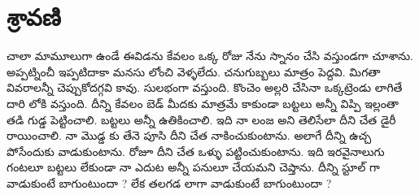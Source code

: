 \documentclass{article}
\begin{document}
\section*{శ్రావణి}
చాలా మామూలుగా ఉండే ఈవిడను కేవలం ఒక్క రోజు నేను స్నానం చేసి వస్తుండగా చూశాను. అప్పట్నించీ ఇప్పటిదాకా 
మనసు లోంచి వెళ్ళలేదు. చనుగుబ్బలు మాత్రం పెద్దవి. మిగతా వివరాలన్నీ చెప్పుకోదగ్గవి కావు. సులభంగా వస్తుంది. 
కొంచెం అల్లరి చేసినా ఒక్కట్రెండు లాగితే దారి లోకి వస్తుంది.  దీన్ని కేవలం బెడ్ మీదకు మాత్రమే కాకుండా బట్టలు అన్నీ విప్పి 
ఇల్లంతా తడి గుడ్డ పెట్టించాలి. బట్టలు అన్నీ ఉతికించాలి. ఇది నా లంజ అని తెలిసేలా దీని చేత డైరీ రాయించాలి. 
నా మొడ్డ కు తేనె పూసి దీని చేత నాకించుకుంటాను.  అలాగే దీన్ని ఉచ్చ పోసేందుకు వాడుకుంటాను.  
రోజూ దీని చేత ఒళ్ళు పట్టించుకుంటాను. ఇది ఇరవైనాలుగు గంటలూ బట్టలు లేకుండా నా ఎదుట అన్నీ పనులూ చేయమని చెప్తాను.
దీన్ని స్టూల్ గా వాడుకుంటే బాగుంటుందా ? లేక తలగడ లాగా వాడుకుంటే బాగుంటుందా ?
\end{document}
